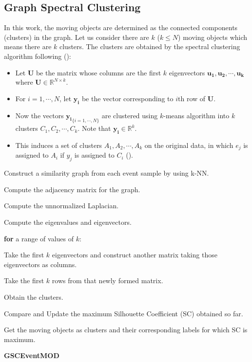 \documentclass{article}
\begin{document}
\subsection{Graph Spectral Clustering}
In this work, the moving objects are determined as the connected components (clusters) in the graph. Let us consider there are $k$ ($k\leq N$) moving objects which means there are $k$ clusters. The clusters are obtained by the spectral clustering algorithm following (\cite{shi2000normalized}):

\begin{itemize}[leftmargin=*]
    \itemsep0em
    \item Let $\mathbf{U}$ be the matrix whose columns are the first $k$ eigenvectors $\mathbf{u_1}, \mathbf{u_2},\cdots, \mathbf{u_k}$ where $\mathbf{U} \in \mathbb{R}^{N \times k}$.
    \item For $i= 1,\cdots , N$, let $\mathbf{y_i}$ be the vector corresponding to $i$th row of $\mathbf{U}$.
    \item Now the vectors ${\mathbf{y_i}}_{\{i=1,\cdots , N\}}$ are clustered using $k$-means algorithm into $k$ clusters $C_1, C_2,\cdots , C_k$. Note that $\mathbf{y_i} \in \mathbb{R}^{k}$. 
    \item This induces a set of clusters $A_1, A_2, \cdots , A_k$ on the original data, in which $e_j$ is assigned to $A_i$ if $y_j$ is assigned to $C_i$ (\cite{tung2010enabling}).
    
\end{itemize}

\begin{algorithm}[]

\nl  Construct a similarity graph from each event sample by using k-NN.

\nl Compute the adjacency matrix for the graph.

\nl Compute the unnormalized Laplacian.

\nl Compute the eigenvalues and eigenvectors.

\nl \SetKwFor{}{}{}{}\textbf{for} a range of values of $k$:

\hspace{\parindent}  Take the first $k$ eigenvectors and construct another matrix taking those eigenvectors as
columns.

\hspace{\parindent}   Take the first $k$ rows from that newly formed matrix.

\hspace{\parindent}   Obtain the clusters. 

\hspace{\parindent}   Compare and Update the maximum Silhouette Coefficient (SC) obtained so far.

\nl Get the moving objects as clusters and their corresponding labels for which SC is maximum.

    \caption{{\bf GSCEventMOD} \label{GSCEventMOD}}

\end{algorithm}
    
\end{document}
